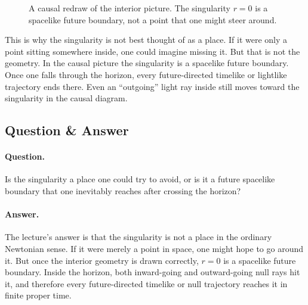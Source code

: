\begin{figure}[htbp]
\centering
{}
\caption{A causal redraw of the interior picture. The singularity \(r=0\) is a spacelike future boundary, not a point that one might steer around.}
\end{figure}

This is why the singularity is not best thought of as a place. If it were only a point sitting somewhere inside, one could imagine missing it. But that is not the geometry. In the causal picture the singularity is a spacelike future boundary. Once one falls through the horizon, every future-directed timelike or lightlike trajectory ends there. Even an ``outgoing'' light ray inside still moves toward the singularity in the causal diagram.

\subsection{Question \& Answer}

\paragraph{Question.} Is the singularity a place one could try to avoid, or is it a future spacelike boundary that one inevitably reaches after crossing the horizon?

\paragraph{Answer.} The lecture’s answer is that the singularity is not a place in the ordinary Newtonian sense. If it were merely a point in space, one might hope to go around it. But once the interior geometry is drawn correctly, \(r=0\) is a spacelike future boundary. Inside the horizon, both inward-going and outward-going null rays hit it, and therefore every future-directed timelike or null trajectory reaches it in finite proper time.

